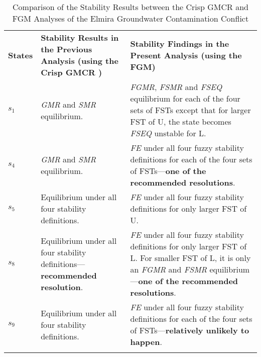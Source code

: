 \begin{table}[!t]
\centering
\caption{Comparison of the Stability Results between the Crisp GMCR and FGM Analyses of the Elmira Groundwater Contamination Conflict}
\footnotesize
\setlength{\tabcolsep}{3pt}
\renewcommand{\arraystretch}{1.4}
\begin{tabular}[t]{x{1.5cm}|p{7cm}|p{7cm}}


 {\bf States} & {\bf Stability Results in the Previous Analysis (using the Crisp GMCR \citep{Hipel-et-al1993a, Hipel-et-al1999, Kilgour-et-al2001})} & {\bf Stability Findings in the Present Analysis (using the FGM)} \\


 $s_1$ & \emph{GMR} and \emph{SMR} equilibrium. & \emph{FGMR}, \emph{FSMR} and \emph{FSEQ} equilibrium for each of the four sets of FSTs except that for larger FST of U, the state becomes \emph{FSEQ} unstable for L. \\\hline

 $s_4$ & \emph{GMR} and \emph{SMR} equilibrium. & \emph{FE} under all four fuzzy stability definitions for each of the four sets of FSTs---{\bf one of the recommended resolutions}. \\\hline

 $s_5$ & Equilibrium under all four stability definitions. & \emph{FE} under all four fuzzy stability definitions for only larger FST of U. \\\hline

 $s_8$ & Equilibrium under all four stability definitions---{\bf recommended resolution}. & \emph{FE} under all four
 fuzzy stability definitions for only larger FST of L. For smaller FST of L, it is only an \emph{FGMR} and \emph{FSMR}
 equilibrium---{\bf one of the recommended resolutions}. \\\hline

 $s_9$ & Equilibrium under all four stability definitions. & \emph{FE} under all four fuzzy stability definitions for each of the four sets of FSTs---{\bf relatively unlikely to happen}. \\[0.5mm]


\end{tabular}
\label{tbl-comparison}
\end{table}

